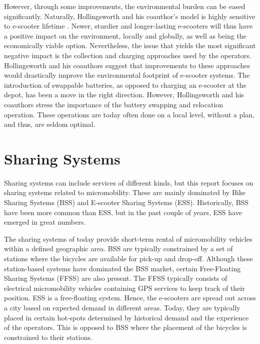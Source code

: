 However, through some improvements, the environmental burden can be eased significantly. Naturally, Hollingsworth and his coauthor's model is highly sensitive to e-scooter lifetime \citep{hollingsworth_are_2019}. Newer, sturdier and longer-lasting e-scooters will thus have a positive impact on the environment, locally and globally, as well as being the economically viable option. Nevertheless, the issue that yields the most significant negative impact is the collection and charging approaches used by the operators. Hollingsworth and his coauthors suggest that improvements to these approaches would drastically improve the environmental footprint of e-scooter systems. The introduction of swappable batteries, as opposed to charging an e-scooter at the depot, has been a move in the right direction. However, Hollingsworth and his coauthors stress the importance of the battery swapping and relocation operation. These operations are today often done on a local level, without a plan, and thus, are seldom optimal.

\section{Sharing Systems}\label{sharing}

Sharing systems can include services of different kinds, but this report focuses on sharing systems related to micromobility. These are mainly dominated by Bike Sharing Systems (BSS)  and E-scooter Sharing Systems (ESS). Historically, BSS have been more common than ESS, but in the past couple of years, ESS have emerged in great numbers.

The sharing systems of today provide short-term rental of micromobility vehicles within a defined geographic area. BSS are typically constrained by a set of stations where the bicycles are available for pick-up and drop-off. Although these station-based systems have dominated the BSS market, certain Free-Floating Sharing Systems (FFSS) are also present. The FFSS typically consists of electrical micromobility vehicles containing GPS services to keep track of their position. ESS is a free-floating system. Hence, the e-scooters are spread out across a city based on expected demand in different areas. Today, they are typically placed in certain hot-spots determined by historical demand and the experience of the operators. This is opposed to BSS where the placement of the bicycles is constrained to their stations. 

